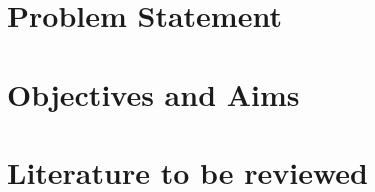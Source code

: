\section{Problem Statement}
\begin{body}
\lipsum[2-3]

\end{body}

\clearpage
\section{Objectives and Aims}
\begin{body}
\lipsum[2-3]

\end{body}
\clearpage
\section{Literature to be reviewed}
